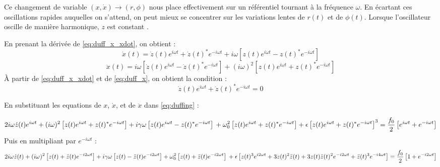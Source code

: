 Ce changement de variable $(x, \dot{x}) \to (r, \phi)$ nous place effectivement sur un référentiel tournant à la fréquence $\omega$. 
En écartant ces oscillations rapides auquelles on s'attend, on peut mieux se concentrer sur les variations lentes de $r(t)$ et de $\phi(t)$. 
Lorsque l'oscillateur oscille de manière harmonique, $z$ est constant \cite{pistolesi_duffing_nodate}.

En prenant la dérivée de \eqref{eq:duff_x_xdot}, on obtient :
\begin{equation}
    \dot{x}(t) = \dot{z}(t)e^{i\omega t} + \dot{z}(t)^* e^{-i\omega t} + i\omega \left[ z(t)e^{i\omega t} - z(t)^* e^{-i\omega t} \right]
    \label{eq:duff_x}
\end{equation}
\begin{equation}
    \ddot{x}(t) = i\omega \left[ \dot{z}(t)e^{i\omega t} - \dot{z}(t)^* e^{-i\omega t} \right] + (i\omega)^2 \left[ z(t)e^{i\omega t} + z(t)^* e^{-i\omega t} \right]
\end{equation}
À partir de \eqref{eq:duff_x_xdot} et de \eqref{eq:duff_x}, on obtient la condition :
\begin{equation}
    \dot{z}(t)e^{i\omega t} + \dot{z}(t)^* e^{-i\omega t} = 0
\end{equation}

En substituant les equations de $x$, $\dot{x}$, et de $\ddot{x}$ dans \eqref{eq:duffing} :

\begin{dmath}
    2i\omega \dot{z}(t)e^{i\omega t} + (i\omega)^2 \left[ z(t)e^{i\omega t} + z(t)^* e^{-i\omega t} \right]
    + i\gamma\omega \left[ z(t)e^{i\omega t} - z(t)^* e^{-i\omega t} \right] \\
    + \omega_0^2 \left[ z(t)e^{i\omega t} + z(t)^* e^{-i\omega t} \right]
    + \epsilon \left[ z(t)e^{i\omega t} + z(t)^* e^{-i\omega t} \right]^3 = \frac{f_0}{2}\left[ e^{i\omega t} + e^{-i\omega t} \right]
\end{dmath}
Puis en multipliant par $e^{-i\omega t}$ :
\begin{dmath}
    2i\omega \dot{z}(t) + (i\omega)^2 \left[ z(t) + \bar{z}(t) e^{-i 2 \omega t} \right]
    + i\gamma\omega \left[ z(t) - \bar{z}(t) e^{-i 2 \omega t} \right]
    + \omega_0^2 \left[ z(t) + \bar{z}(t) e^{-i 2 \omega t} \right] \\
    + \epsilon \left[ z(t)^3 e^{i 2 \omega t} + 3 z(t)^2 \bar{z}(t) + 3z(t)\bar{z}(t)^2 e^{-i2\omega t} + \bar{z}(t)^3 e^{-i4 \omega t} \right]
    = \frac{f_0}{2}\left[ 1 + e^{-i 2 \omega t} \right]
    \label{eq:duff_pre_av}
\end{dmath}

